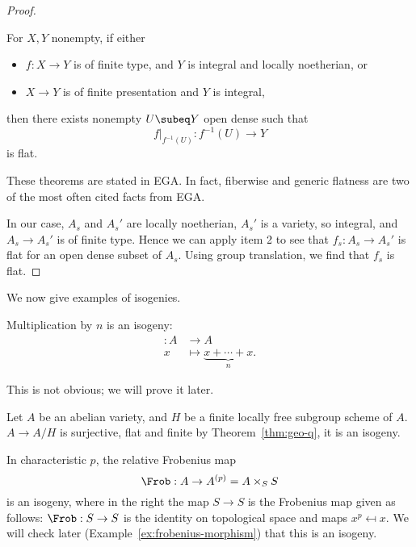 \begin{proof}
\begin{enumerate}
\begin{pr}
For $X,Y$ nonempty, if either
\begin{itemize}
\item
$f:X\to Y$ is of finite type, and $Y$ is integral and locally noetherian, or
\item
$X\to Y$ is of finite presentation and $Y$ is integral,
\end{itemize}
then there exists nonempty $U\subeq Y$ open dense such that 
\[
f|_{f^{-1}(U)}:f^{-1}(U)\to Y
\] 
is flat.
\end{pr}
\end{enumerate}
These theorems are stated in EGA. In fact, fiberwise and generic flatness are two of the most often cited facts from EGA. 

In our case, $A_s$ and $A_s'$ are locally noetherian, $A_s'$ is a variety, so integral, and $A_s\to A_s'$ is of finite type. Hence we can apply item 2 to see that $f_s:A_s\to A_s'$ is flat for an open dense subset of $A_s$. Using group translation, we find that $f_s$ is flat. 



\end{proof}

We now give examples of isogenies.
\begin{ex}[Multiplication by $n$]
Multiplication by $n$ is an isogeny:
\begin{align*}
[n]:A& \to A\\
x&\mapsto \underbrace{x+\cdots +x}_n.
\end{align*}
\end{ex}
This is not obvious; we will prove it later.

\begin{ex}
Let $A$ be an abelian variety, and $H$ be a finite locally free subgroup scheme of $A$. 
$A\to A/H$ is surjective, flat and finite by Theorem~\ref{thm:geo-q}, it is an isogeny.
\end{ex}
\begin{ex}
In characteristic $p$, the relative Frobenius map 
\[
\Frob:A\to A^{(p)} =A\times_S S
\]
is an isogeny, 
where in the right the map $S\to S$ is the Frobenius map given as follows: $\Frob:S\to S$ is the identity on topological space and maps $x^p\mapsfrom x$. We will check later (Example~\ref{ex:frobenius-morphism}) that this is an isogeny.
\end{ex}

